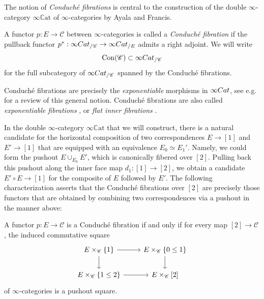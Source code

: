 \documentclass[a4paper, 11pt]{amsart}
\numberwithin{theorem}{section}
\theoremstyle{definition}
\newcommand{\cat}[1]{\textup{#1}}
\newcommand{\Cat}{\cat{Cat}}
\newcommand{\C}{\mathscr{C}}
\newcommand{\Con}{\mathrm{Con}}
\newcommand{\CCAT}{\mathbb{C}\mathrm{at}}
\begin{document}
The notion 
of \textit{Conduch\'e fibrations} is central to the construction of the double $\infty$-category $\infty\CCAT$ of $\infty$-categories by Ayala and Francis.

\begin{definition}
	A functor $p:E\rightarrow \C$ between $\infty$-categories is called a \textit{Conduch\'e fibration} if the pullback functor 
	$
	p^* : \infty\Cat_{/\C} \rightarrow \infty\Cat_{/E}
	$
	admits a right adjoint. We will write $$\Con(\C) \subset \infty\Cat_{/\C}$$ for the
	 full subcategory of $\infty\Cat_{/\C}$ spanned by 
	the Conduch\'e fibrations.
\end{definition}

\begin{remark}
Conduch\'e fibrations are precisely the \textit{exponentiable} morphisms in $\infty\Cat$, see e.g.\ \cite[Section 2]{Comp} for a review of this general notion.
Conduch\'e fibrations are also called \textit{exponentiable fibrations} \cite{AyalaFrancisRozenblyum} \cite{AyalaFrancis}, or \textit{flat inner fibrations} \cite[Appendix B.3]{HA}.
\end{remark}

In the double $\infty$-category $\infty\CCAT$ that we will construct, there is a natural candidate for the horizontal composition 
of two correspondences $E \rightarrow [1]$ and $E' \rightarrow [1]$ that 
are equipped with an equivalence $E_0 \simeq E_1'$. Namely,
we could form the pushout $E \cup_{E_0} E'$, which is canonically fibered over $[2]$. Pulling back this pushout  
along the inner face map $d_1 : [1] \rightarrow [2]$, we obtain a candidate $E' \circ E\rightarrow [1]$ for the composite of $E$ followed by $E'$. The following 
characterization asserts that the Conduch\'e fibrations 
over $[2]$ are precisely those functors that are obtained 
by combining two correspondences via a pushout in the manner above:

\begin{proposition}\label{prop.conduche-fib-characterization}
	A functor $p : E \rightarrow \C$ is a Conduch\'e fibration if and only if for every map $[2] \rightarrow \C$, 
	the induced commutative square 
	\[
		\begin{tikzcd}
			E \times_{\C} \{1\} \arrow[r]\arrow[d] & E \times_{\C} \{0\leq 1\} \arrow[d] \\ 
			E \times_{\C} \{1\leq 2\} \arrow[r] & E \times_{\C} [2]
		\end{tikzcd}
	\]
	of $\infty$-categories is a pushout square.
\end{proposition}
\end{document}
